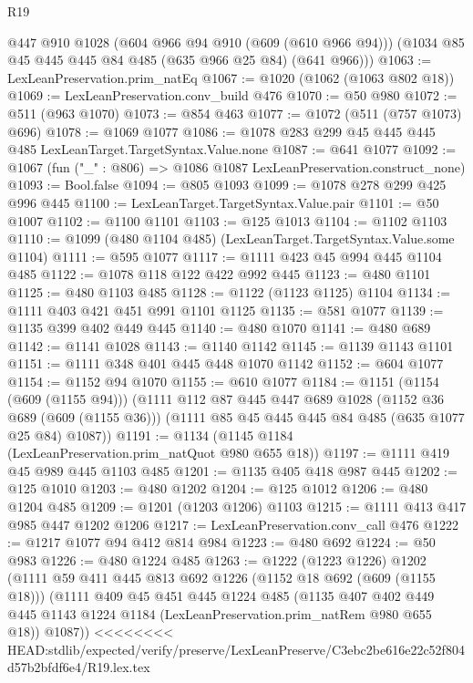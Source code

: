\begin{lexlean}{R19}
\begin{coremodule}
{{{{{{{{{{{{{{{      @447
      @910
      @1028
      (@604 @966 @94 @910 (@609 (@610 @966 @94)))
      (@1034 @85 @45 @445 @445 @84 @485 (@635 @966 @25 @84) (@641 @966)))
@1063 := LexLeanPreservation.prim_natEq
@1067 := @1020 (@1062 (@1063 @802 @18))
@1069 := LexLeanPreservation.conv_build @476
@1070 := @50 @980
@1072 := @511 (@963 @1070)
@1073 := @854 @463
@1077 := @1072 (@511 (@757 @1073) @696)
@1078 := @1069 @1077
@1086 := @1078 @283 @299 @45 @445 @445 @485 LexLeanTarget.TargetSyntax.Value.none
@1087 := @641 @1077
@1092 := @1067 (fun ("_" : @806) => @1086 @1087 LexLeanPreservation.construct_none)
@1093 := Bool.false
@1094 := @805 @1093
@1099 := @1078 @278 @299 @425 @996 @445
@1100 := LexLeanTarget.TargetSyntax.Value.pair
@1101 := @50 @1007
@1102 := @1100 @1101
@1103 := @125 @1013
@1104 := @1102 @1103
@1110 := @1099 (@480 @1104 @485) (LexLeanTarget.TargetSyntax.Value.some @1104)
@1111 := @595 @1077
@1117 := @1111 @423 @45 @994 @445 @1104 @485
@1122 := @1078 @118 @122 @422 @992 @445
@1123 := @480 @1101
@1125 := @480 @1103 @485
@1128 := @1122 (@1123 @1125) @1104
@1134 := @1111 @403 @421 @451 @991 @1101 @1125
@1135 := @581 @1077
@1139 := @1135 @399 @402 @449 @445
@1140 := @480 @1070
@1141 := @480 @689
@1142 := @1141 @1028
@1143 := @1140 @1142
@1145 := @1139 @1143 @1101
@1151 := @1111 @348 @401 @445 @448 @1070 @1142
@1152 := @604 @1077
@1154 := @1152 @94 @1070
@1155 := @610 @1077
@1184 := @1151
    (@1154 (@609 (@1155 @94)))
    (@1111
      @112
      @87
      @445
      @447
      @689
      @1028
      (@1152 @36 @689 (@609 (@1155 @36)))
      (@1111 @85 @45 @445 @445 @84 @485 (@635 @1077 @25 @84) @1087))
@1191 := @1134 (@1145 @1184 (LexLeanPreservation.prim_natQuot @980 @655 @18))
@1197 := @1111 @419 @45 @989 @445 @1103 @485
@1201 := @1135 @405 @418 @987 @445
@1202 := @125 @1010
@1203 := @480 @1202
@1204 := @125 @1012
@1206 := @480 @1204 @485
@1209 := @1201 (@1203 @1206) @1103
@1215 := @1111 @413 @417 @985 @447 @1202 @1206
@1217 := LexLeanPreservation.conv_call @476
@1222 := @1217 @1077 @94 @412 @814 @984
@1223 := @480 @692
@1224 := @50 @983
@1226 := @480 @1224 @485
@1263 := @1222
    (@1223 @1226)
    @1202
    (@1111
      @59
      @411
      @445
      @813
      @692
      @1226
      (@1152 @18 @692 (@609 (@1155 @18)))
      (@1111
        @409
        @45
        @451
        @445
        @1224
        @485
        (@1135
          @407
          @402
          @449
          @445
          @1143
          @1224
          @1184
          (LexLeanPreservation.prim_natRem @980 @655 @18))
        @1087))
<<<<<<<< HEAD:stdlib/expected/verify/preserve/LexLeanPreserve/C3ebc2be616e22c52f804d57b2bfdf6e4/R19.lex.tex
}}}}}}}}}}}}}}}
\end{coremodule}
\end{lexlean}
